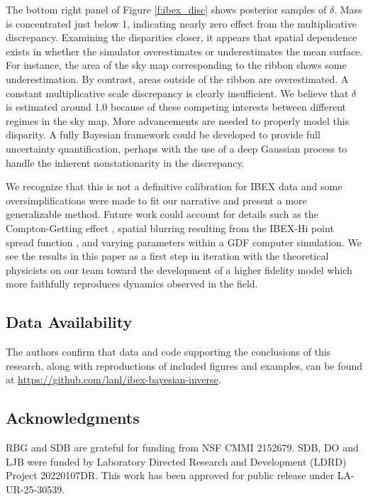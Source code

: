 \documentclass[11pt]{article}
\begin{document}
The bottom right panel of Figure \ref{f:ibex_disc} shows posterior samples of
$\delta$. Mass is concentrated just below 1, indicating nearly zero effect from
the multiplicative discrepancy. Examining the disparities closer, it appears
that spatial dependence exists in whether the simulator overestimates or
underestimates the mean surface. For instance, the area of the sky map
corresponding to the ribbon shows some underestimation. By contrast, areas
outside of the ribbon are overestimated. A constant multiplicative scale
discrepancy is clearly insufficient. We believe that $\delta$ is estimated
around 1.0 because of these competing interests between different regimes in
the sky map. More advancements are needed to properly model this disparity. A
fully Bayesian framework could be developed to provide full uncertainty quantification, perhaps with the use of a deep Gaussian process to handle the
inherent nonstationarity in the discrepancy.

We recognize that this is not a definitive calibration for IBEX data and some
oversimplifications were made to fit our narrative and present a more
generalizable method. Future work could account for details such as the
Compton-Getting effect \citep{compton1935apparent}, spatial blurring resulting
from the IBEX-Hi point spread function \citep{funsten2009IBEXHiENA}, and
varying parameters within a GDF computer simulation. We see the results in this
paper as a first step in iteration with the theoretical physicists on our team
toward the development of a higher fidelity model which more faithfully
reproduces dynamics observed in the field.

\subsection*{Data Availability}

The authors confirm that data and code supporting the conclusions of this
research, along with reproductions of included figures and examples, can be
found at \url{https://github.com/lanl/ibex-bayesian-inverse}.

\subsection*{Acknowledgments}

RBG and SDB are grateful for funding from NSF CMMI 2152679. SDB, DO and LJB
were funded by Laboratory Directed Research and Development (LDRD) Project
20220107DR. This work has been approved for public release under
LA-UR-25-30539.
\end{document}
